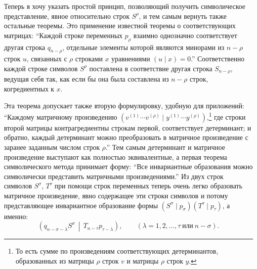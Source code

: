 \documentclass[11pt]{article}
\newcommand{\pair}[2]{\left(#1\,\middle|\,#2\right)}
\begin{document}
Теперь я хочу указать простой принцип, позволяющий получить символическое представление, явное относительно строк $S^\rho$, и тем самым вернуть также остальные теоремы. Это применение известной теоремы о соответствующих матрицах: ``Каждой строке переменных $p_\rho$ взаимно однозначно соответствует другая строка $q_{n-\rho}$, отдельные элементы которой являются минорами из $n-\rho$ строк $u$, связанных с $\rho$ строками $x$ уравнениями $(u\mid x)=0$.'' Соответственно каждой строке символов $S^\rho$ поставлена в соответствие другая строка $S_{n-\rho}$, ведущая себя так, как если бы она была составлена из $n-\rho$ строк, когредиентных к $x$.

Эта теорема допускает также вторую формулировку, удобную для приложений: ``Каждому матричному произведению $(v^{(1)}\cdots v^{(\rho)}\mid y^{(1)}\cdots y^{(\rho)})$,\footnote{То есть сумме по произведениям соответствующих детерминантов, образованных из матрицы $\rho$ строк $v$ и матрицы $\rho$ строк $y$.} где строки второй матрицы контрагредиентны строкам первой, соответствует детерминант; и обратно, каждый детерминант можно преобразовать в матричное произведение с заранее заданным числом строк $\rho$.'' Тем самым детерминант и матричное произведение выступают как полностью эквивалентные, а первая теорема символического метода принимает форму: ``Все инвариантные образования можно символически представить матричными произведениями.'' Из двух строк символов $S^\sigma$, $T^\tau$ при помощи строк переменных теперь очень легко образовать матричное произведение, явно содержащее эти строки символов и потому представляющее инвариантное образование формы $(S^\sigma\mid p_\sigma)(T^\tau\mid p_\tau)$, а именно:
\begin{equation}
 \pair{q_{n-\sigma-\lambda}S^\sigma}{T_{n-\tau}p_{\tau-\lambda}},
 \qquad (\lambda=1,2,\ldots,\tau\ \text{или}\ n-\sigma).
\tag{1}
\end{equation}
\end{document}
